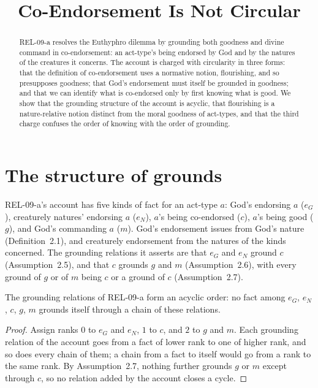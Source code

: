 \documentclass{situationist-preprint}
\title{Co-Endorsement Is Not Circular}
\begin{document}
\maketitle

\begin{abstract}
REL-09-a resolves the Euthyphro dilemma by grounding both goodness and divine command in co-endorsement: an act-type's being endorsed by God and by the natures of the creatures it concerns. The account is charged with circularity in three forms: that the definition of co-endorsement uses a normative notion, flourishing, and so presupposes goodness; that God's endorsement must itself be grounded in goodness; and that we can identify what is co-endorsed only by first knowing what is good. We show that the grounding structure of the account is acyclic, that flourishing is a nature-relative notion distinct from the moral goodness of act-types, and that the third charge confuses the order of knowing with the order of grounding.
\end{abstract}

\section{The structure of grounds}

REL-09-a's account has five kinds of fact for an act-type $a$: God's endorsing $a$ ($e_G$), creaturely natures' endorsing $a$ ($e_N$), $a$'s being co-endorsed ($c$), $a$'s being good ($g$), and God's commanding $a$ ($m$). God's endorsement issues from God's nature (Definition~2.1), and creaturely endorsement from the natures of the kinds concerned. The grounding relations it asserts are that $e_G$ and $e_N$ ground $c$ (Assumption~2.5), and that $c$ grounds $g$ and $m$ (Assumption~2.6), with every ground of $g$ or of $m$ being $c$ or a ground of $c$ (Assumption~2.7).

\begin{proposition}\label{p:acyclic}
The grounding relations of REL-09-a form an acyclic order: no fact among $e_G$, $e_N$, $c$, $g$, $m$ grounds itself through a chain of these relations.
\end{proposition}

\begin{proof}
Assign ranks $0$ to $e_G$ and $e_N$, $1$ to $c$, and $2$ to $g$ and $m$. Each grounding relation of the account goes from a fact of lower rank to one of higher rank, and so does every chain of them; a chain from a fact to itself would go from a rank to the same rank. By Assumption~2.7, nothing further grounds $g$ or $m$ except through $c$, so no relation added by the account closes a cycle.
\end{proof}
\end{document}
